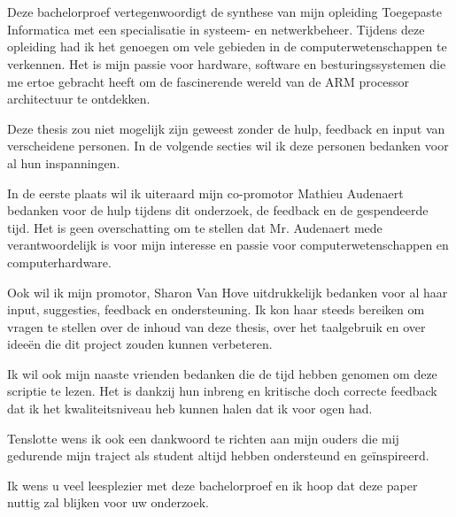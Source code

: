 
\chapter*{}
\label{ch:voorwoord}


Deze bachelorproef vertegenwoordigt de synthese van mijn opleiding Toegepaste Informatica met een specialisatie in systeem- en netwerkbeheer. Tijdens deze opleiding had ik het genoegen om vele gebieden in de computerwetenschappen te verkennen. Het is mijn passie voor hardware, software en besturingssystemen die me ertoe gebracht heeft om de fascinerende wereld van de ARM processor architectuur te ontdekken.

Deze thesis zou niet mogelijk zijn geweest zonder de hulp, feedback en input van verscheidene personen. In de volgende secties wil ik deze personen bedanken voor al hun inspanningen. 

In de eerste plaats wil ik uiteraard mijn co-promotor Mathieu Audenaert bedanken voor de hulp tijdens dit onderzoek, de feedback en de gespendeerde tijd. Het is geen overschatting om te stellen dat Mr. Audenaert mede verantwoordelijk is voor mijn interesse en passie voor computerwetenschappen en computerhardware.

Ook wil ik mijn promotor, Sharon Van Hove uitdrukkelijk bedanken voor al haar input, suggesties, feedback en ondersteuning. Ik kon haar steeds bereiken om vragen te stellen over de inhoud van deze thesis, over het taalgebruik en over ideeën die dit project zouden kunnen verbeteren.

Ik wil ook mijn naaste vrienden bedanken die de tijd hebben genomen om deze scriptie te lezen. Het is dankzij hun inbreng en kritische doch correcte feedback dat ik het kwaliteitsniveau heb kunnen halen dat ik voor ogen had.

Tenslotte wens ik ook een dankwoord te richten aan mijn ouders die mij gedurende mijn traject als student altijd hebben ondersteund en geïnspireerd. 

Ik wens u veel leesplezier met deze bachelorproef en ik hoop dat deze paper nuttig zal blijken voor uw onderzoek.
